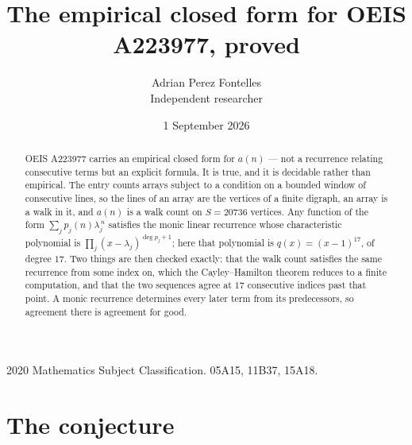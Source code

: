 \documentclass[11pt,a4paper]{article}
\title{The empirical closed form for OEIS A223977, proved}
\author{Adrian Perez Fontelles\\ \small Independent researcher}
\date{1 September 2026}
\theoremstyle{plain}
\theoremstyle{definition}
\begin{document}
\maketitle

\begin{abstract}
OEIS A223977 carries an empirical closed form for $a(n)$ --- not a recurrence relating
consecutive terms but an explicit formula. It is true, and it is decidable rather than
empirical. The entry counts arrays subject to a condition on a bounded window of consecutive lines, so the lines of an array are the
vertices of a finite digraph, an array is a walk in it, and $a(n)$ is a walk count on
$S=20736$ vertices. Any function of the form $\sum_j p_j(n)\lambda_j^{\,n}$ satisfies the
monic linear recurrence whose characteristic polynomial is
$\prod_j(x-\lambda_j)^{\deg p_j+1}$; here that polynomial is $q(x)=(x-1)^{17}$, of degree
$17$. Two things are then checked exactly: that the walk count satisfies the same
recurrence from some index on, which the Cayley--Hamilton theorem reduces to a finite
computation, and that the two sequences agree at $17$ consecutive indices past that
point. A monic recurrence determines every later term from its predecessors, so agreement
there is agreement for good.
\end{abstract}

\noindent\small 2020 Mathematics Subject Classification. 05A15, 11B37, 15A18.\normalsize

\section{The conjecture}
\end{document}
